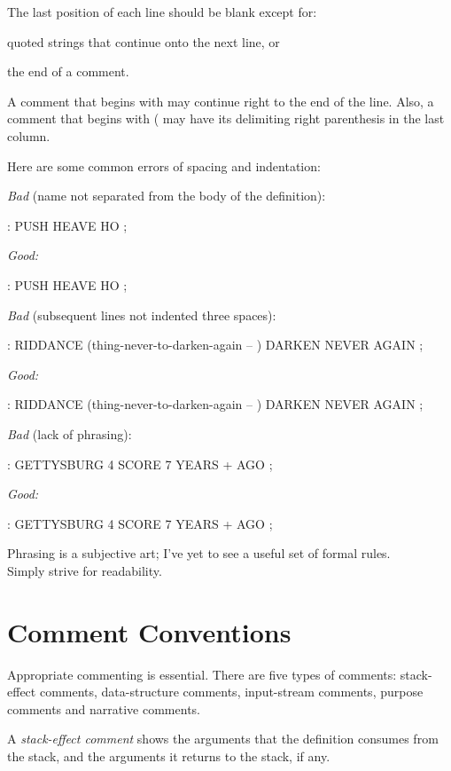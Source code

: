 
The last position of each line should be blank except for:
\begin{list}{)}{}
\item quoted strings that continue onto the next line, or
\item the end of a comment.
\end{list}
A comment that begins with \forth{\bs} may continue right to the end
of the line.  Also, a comment that begins with ( may have its
delimiting right parenthesis in the last column.

Here are some common errors of spacing and indentation:

\goodbreak\bigskip\noindent
\emph{Bad} (name not separated from the body of the definition):
\begin{Code}
: PUSH HEAVE HO ;
\end{Code}
\emph{Good:}
\begin{Code}
: PUSH   HEAVE HO ;
\end{Code}
\emph{Bad} (subsequent lines not indented three spaces):
\begin{Code}
: RIDDANCE  (thing-never-to-darken-again -- )
DARKEN  NEVER AGAIN ;
\end{Code}
\emph{Good:}
\begin{Code}
: RIDDANCE  (thing-never-to-darken-again -- )
   DARKEN  NEVER AGAIN ;
\end{Code}
\emph{Bad} (lack of phrasing):
\begin{Code}
: GETTYSBURG   4 SCORE 7 YEARS + AGO ;
\end{Code}
\goodbreak\noindent
\emph{Good:}
\begin{Code}
: GETTYSBURG   4 SCORE   7 YEARS +   AGO ;
\end{Code}
Phrasing is a subjective art;
I've yet to see a useful set of formal rules.\\
Simply strive for readability.

\section{Comment Conventions}

Appropriate commenting is essential.  There are five types of comments:
stack-effect comments, data-structure comments, input-stream comments,
purpose comments and narrative comments.

A \emph{stack-effect comment}
shows the arguments that the definition consumes from the stack, and
the arguments it returns to the stack, if any.

